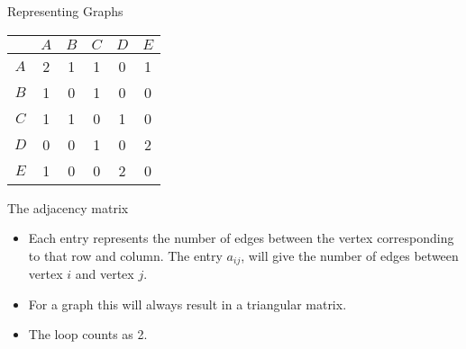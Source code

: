 \documentclass[8pt]{beamer}
\begin{document}
\begin{frame}{Representing Graphs}
\begin{center}
	\colorbox{cc!30}{
		\setlength\arrayrulewidth{0.5mm}
\begin{tabular}{c|ccccc}
	& $A$ & $B$ & $C$ & $D$ & $E$ \\
	\hline
	$A$ & 2 & 1 & 1 & 0 & 1 \\
	$B$ & 1 & 0 & 1 & 0 & 0 \\
	$C$ & 1 & 1 & 0 & 1 & 0 \\
	$D$ & 0 & 0 & 1 & 0 & 2 \\
	$E$ & 1 & 0 & 0 & 2 & 0 \\
\end{tabular}}
\end{center}
\begin{alertblock}{The adjacency matrix}
	\begin{itemize}
		\item Each entry represents the number of edges between the vertex corresponding to that row and column. The entry $a_{ij}$, will give the number of edges between vertex $i$ and vertex  $j$.
		\item For a graph this will always result in a triangular matrix.
		\item The loop counts as 2.
	\end{itemize}
	
\end{alertblock}
\end{frame}
\end{document}
